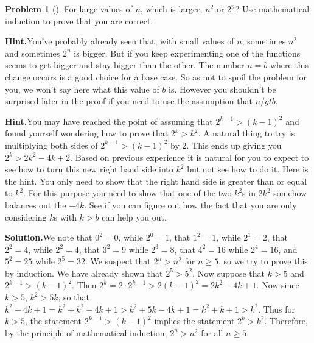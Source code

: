 \documentclass[10pt,]{book}
\theoremstyle{plain}
\theoremstyle{definition}
\newtheorem{activity}[project]{Problem}
\theoremstyle{definition}
\numberwithin{equation}{chapter}
\newcommand{\gt}{>}
\begin{document}
\begin{activity}[]\label{activity-365}
For large values of \(n\), which is larger, \(n^2\) or \(2^n\)? Use mathematical induction to prove that you are correct.%
\par\medskip\noindent%
\textbf{Hint.}\quad You've probably already seen that, with small values of \(n\), sometimes \(n^2\) and sometimes \(2^n\) is bigger. But if you keep experimenting one of the functions  seems to get bigger and stay bigger than the other. The number \(n=b\) where this change occurs is a good choice for a base case. So as not to spoil the problem for you, we won't say here what this value of \(b\) is. However you    shouldn't be surprised later in the proof if you need to use the assumption that \(n /gt b\).%
\par\medskip\noindent%
\textbf{Hint.}\quad You may have reached the point of assuming that \(2^{k-1} \gt (k-1)^2\) and found yourself wondering how to prove that \(2^k \gt k^2\). A natural thing to try is multiplying both sides of \(2^{k-1} \gt (k-1)^2\) by \(2\). This ends up giving you \(2^k \gt 2k^2 - 4k +2\). Based on previous experience it is natural for you to expect to see how to turn this new right hand side into \(k^2\) but not see how to do it. Here is the hint. You only need to show that the right hand side is greater than or equal to \(k^2\). For this purpose you need to show that one of the two \(k^2\)s in \(2k^2\) somehow balances out the \(-4k\). See if you can figure out how the fact that you are only considering \(k\)s with \(k \gt b\) can help you out.%
\par\medskip\noindent%
\textbf{Solution.}\quad We note that \(0^2=0\), while \(2^0=1\), that \(1^2=1\), while \(2^1=2\), that \(2^2=4\), while \(2^2=4\), that \(3^2=9\) while \(2^3=8\), that \(4^2=16\) while \(2^4=16\), and \(5^2=25\) while \(2^5=32\). We suspect that \(2^n>n^2\) for \(n\ge 5\), so we try to prove this by induction. We have already shown that \(2^5>5^2\). Now suppose that \(k>5\) and \(2^{k-1}>(k-1)^2\). Then \(2^k=2\cdot2^{k-1}>2(k-1)^2=2k^2-4k +1\). Now since \(k>5\), \(k^2>5k\), so that \(k^2-4k+1=k^2+k^2-4k+1>k^2+5k-4k+1=k^2+k+1>k^2\). Thus for \(k>5\), the statement \(2^{k-1}>(k-1)^2\) implies the statement \(2^k>k^2\). Therefore, by the principle of mathematical induction, \(2^n>n^2\) for all \(n\ge 5\).%
\end{activity}
\end{document}

